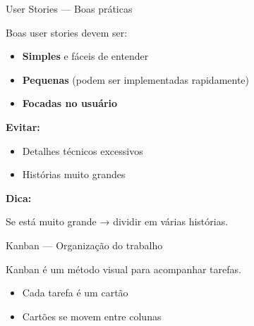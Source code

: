 \documentclass{beamer}
\begin{document}
\begin{frame}{User Stories — Boas práticas}
    
    Boas user stories devem ser:
    
    \begin{itemize}
        \item \textbf{Simples} e fáceis de entender
        \item \textbf{Pequenas} (podem ser implementadas rapidamente)
        \item \textbf{Focadas no usuário}
    \end{itemize}
    
    \vspace{0.4cm}
    
    \textbf{Evitar:}
    
    \begin{itemize}
        \item Detalhes técnicos excessivos
        \item Histórias muito grandes
    \end{itemize}
    
    \vspace{0.4cm}
    
    \textbf{Dica:}
    
    Se está muito grande → dividir em várias histórias.
    
\end{frame}

\begin{frame}{Kanban — Organização do trabalho}
    
    Kanban é um método visual para acompanhar tarefas.
    
    \vspace{0.4cm}
    
    \begin{center}
    \end{center}
    
    \vspace{0.3cm}
    
    \begin{itemize}
        \item Cada tarefa é um cartão
        \item Cartões se movem entre colunas
    \end{itemize}
    
\end{frame}
\end{document}
